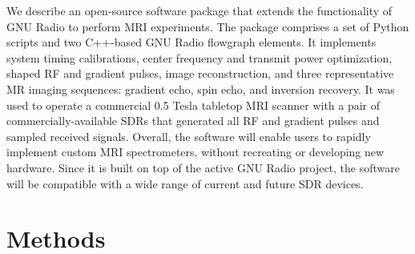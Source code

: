 \documentclass[review]{elsarticle}
\begin{document}
\par We describe an open-source software package that extends the functionality of GNU Radio to perform
MRI experiments. 
The package comprises a set of Python scripts and two C++-based GNU Radio flowgraph elements.
It implements system timing calibrations, center frequency and transmit power optimization, 
shaped RF and gradient pulses, image reconstruction, 
and three representative MR imaging sequences: gradient echo, spin echo, and inversion recovery.
It was used to operate a commercial 0.5 Tesla tabletop MRI scanner with a pair of commercially-available SDRs that generated
all RF and gradient pulses and sampled received signals.
Overall, the software will enable users to rapidly implement custom MRI spectrometers, 
without recreating or developing new hardware. 
Since it is built on top of the active GNU Radio project, 
the software will be compatible with a wide range of current and future SDR devices.


 



\section{Methods}
\end{document}
